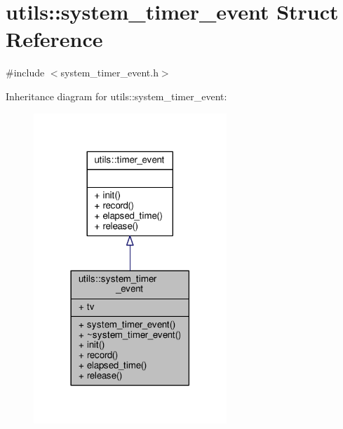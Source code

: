 \hypertarget{structutils_1_1system__timer__event}{\section{utils\-:\-:system\-\_\-timer\-\_\-event Struct Reference}
\label{structutils_1_1system__timer__event}
}


{\ttfamily \#include $<$system\-\_\-timer\-\_\-event.\-h$>$}



Inheritance diagram for utils\-:\-:system\-\_\-timer\-\_\-event\-:
\nopagebreak
\begin{figure}[H]
\begin{center}
\leavevmode
\includegraphics[width=206pt]{structutils_1_1system__timer__event__inherit__graph}
\end{center}
\end{figure}



